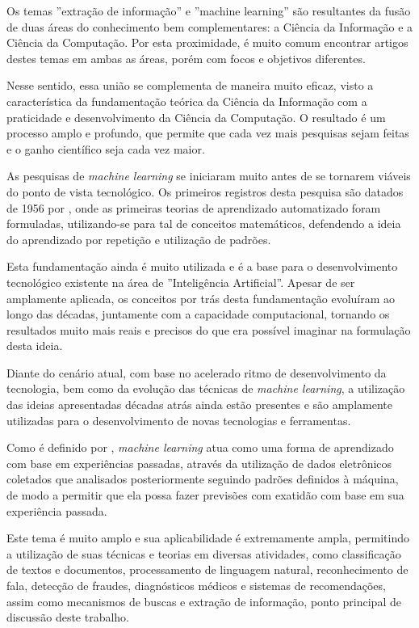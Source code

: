 \begin{textonovo}

Os temas ''extração de informação'' e ''machine learning'' são resultantes da fusão de duas áreas do conhecimento bem complementares: a Ciência da Informação e a Ciência da Computação. Por esta proximidade, é muito comum encontrar artigos destes temas em ambas as áreas, porém com focos e objetivos diferentes.

Nesse sentido, essa união se complementa de maneira muito eficaz, visto a característica da fundamentação teórica da Ciência da Informação com a praticidade e desenvolvimento da Ciência da Computação. O resultado é um processo amplo e profundo, que permite que cada vez mais pesquisas sejam feitas e o ganho científico seja cada vez maior.

As pesquisas de \textit{machine learning} se iniciaram muito antes de se tornarem viáveis do ponto de vista tecnológico. Os primeiros registros desta pesquisa são datados de 1956 por \cite{machine-learning}, onde as primeiras teorias de aprendizado automatizado foram formuladas, utilizando-se para tal de conceitos matemáticos, defendendo a ideia do aprendizado por repetição e utilização de padrões.

Esta fundamentação ainda é muito utilizada e é a base para o desenvolvimento tecnológico existente na área de ''Inteligência Artificial''. Apesar de ser amplamente aplicada, os conceitos por trás desta fundamentação evoluíram ao longo das décadas, juntamente com a capacidade computacional, tornando os resultados muito mais reais e precisos do que era possível imaginar na formulação desta ideia.

Diante do cenário atual, com base no acelerado ritmo de desenvolvimento da tecnologia, bem como da evolução das técnicas de \textit{machine learning}, a utilização das ideias apresentadas décadas atrás ainda estão presentes e são amplamente utilizadas para o desenvolvimento de novas tecnologias e ferramentas.

Como é definido por \cite{foundations-machine-learning}, \textit{machine learning} atua como uma forma de aprendizado com base em experiências passadas, através da utilização de dados eletrônicos coletados que analisados posteriormente seguindo padrões definidos à máquina, de modo a permitir que ela possa fazer previsões com exatidão com base em sua experiência passada.

Este tema é muito amplo e sua aplicabilidade é extremamente ampla, permitindo a utilização de suas técnicas e teorias em diversas atividades, como classificação de textos e documentos, processamento de linguagem natural, reconhecimento de fala, detecção de fraudes, diagnósticos médicos e sistemas de recomendações, assim como mecanismos de buscas e extração de informação, ponto principal de discussão deste trabalho.


\end{textonovo}
